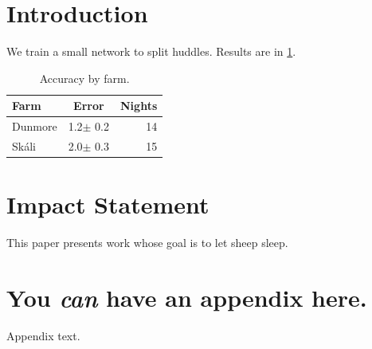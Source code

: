 \documentclass{article}
\begin{document}
\printAffiliationsAndNotice{\icmlEqualContribution}
\begin{abstract}
A one-paragraph abstract about counting sleeping sheep with a learned blob splitter.
\end{abstract}
\section{Introduction}
\label{submission}
We train a small network to split huddles. Results are in \cref{tab:icml}.
\begin{table}[t]
\caption{Accuracy by farm.}
\label{tab:icml}
\vskip 0.15in
\begin{center}
\begin{small}
\begin{sc}
\begin{tabular}{lcr}
\toprule
Farm & Error & Nights \\
\midrule
Dunmore & 1.2$\pm$ 0.2 & 14 \\
Sk\'ali & 2.0$\pm$ 0.3 & 15 \\
\bottomrule
\end{tabular}
\end{sc}
\end{small}
\end{center}
\vskip -0.1in
\end{table}
\section*{Impact Statement}
This paper presents work whose goal is to let sheep sleep.


\newpage
\appendix
\onecolumn
\section{You \emph{can} have an appendix here.}
Appendix text.
\end{document}
